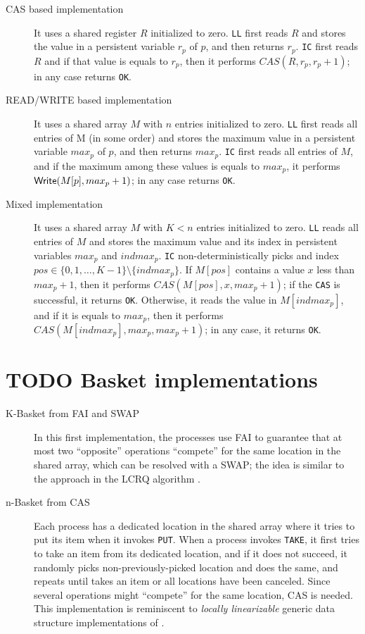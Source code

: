 \documentclass[openany, a4paper]{book}
\theoremstyle{break}
\theoremstyle{example}
\theoremstyle{note}
\theoremstyle{break}
\theoremstyle{exercise}
\newcommand{\W}{{\sf \small Write}\xspace}
\begin{document}
\begin{description}
\item[{CAS based implementation}] It uses a shared register \(R\) initialized to
zero. \texttt{LL} first reads \(R\) and stores the value in a persistent variable
\(r_p\) of \(p\), and then returns \(r_p\). \texttt{IC} first reads \(R\) and if
that value is equals to \(r_p\), then it performs \(CAS(R, r_p, r_p +
      1)\); in any case returns \texttt{OK}.
\item[{READ/WRITE based implementation}] It uses a shared array \(M\) with \(n\)
entries initialized to zero. \texttt{LL} first reads all entries of M (in some
order) and stores the maximum value in a persistent variable \(max_p\) of
\(p\), and then returns \(max_p\). \texttt{IC} first reads all entries of \(M\),
and if the maximum among these values is equals to \(max_p\), it performs
\(\W(M[p], max_p + 1)\); in any case returns \texttt{OK}.
\item[{Mixed implementation}] It uses a shared array \(M\) with \(K < n\)
entries initialized to zero. \texttt{LL} reads all entries of \(M\) and stores the
maximum value and its index in persistent variables \(max_p\) and
\(indmax_p\). \texttt{IC} non-deterministically picks and index \(pos \in \{0, 1,
      \ldots, K - 1\} \setminus \{indmax_p\}\). If \(M[pos]\) contains a value
\(x\) less than \(max_p + 1\), then it performs \(CAS(M[pos], x, max_p +
      1)\); if the \texttt{CAS} is successful, it returns \texttt{OK}. Otherwise, it reads the
value in \(M[indmax_p]\), and if it is equals to \(max_p\), then it
performs \(CAS(M[indmax_p], max_p, max_p + 1)\); in any case, it returns
\texttt{OK}.
\end{description}

\section{{\bfseries\sffamily TODO} Basket implementations}
\label{sec:orgb2e2a52}

\begin{description}
\item[{K-Basket from FAI and SWAP}] In this first implementation, the processes
use FAI to guarantee that at most two ``opposite'' operations ``compete''
for the same location in the shared array, which can be resolved with a
SWAP; the idea is similar to the approach in the LCRQ algorithm
\cite{ppopp2013x86queues}.
\item[{n-Basket from CAS}] Each process has a dedicated location in the shared
array where it tries to put its item when it invokes \texttt{PUT}. When a process
invokes \texttt{TAKE}, it first tries to take an item from its dedicated location,
and if it does not succeed, it randomly picks non-previously-picked
location and does the same, and repeats until takes an item or all
locations have been canceled. Since several operations might ``compete''
for the same location, CAS is needed. This implementation is reminiscent
to \emph{locally linearizable} generic data structure implementations of
\cite{DBLP_conf_concur_HaasHHKLPSSV16}.
\end{description}
\end{document}
